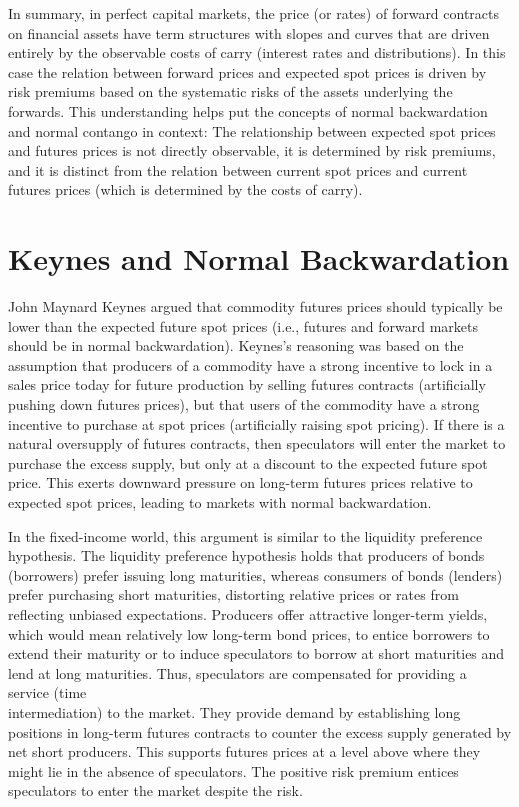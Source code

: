 \documentclass[11pt]{article}
\begin{document}
In summary, in perfect capital markets, the price (or rates) of forward contracts on financial assets have term structures with slopes and curves that are driven entirely by the observable costs of carry (interest rates and distributions). In this case the relation between forward prices and expected spot prices is driven by risk premiums based on the systematic risks of the assets underlying the forwards. This understanding helps put the concepts of normal backwardation and normal contango in context: The relationship between expected spot prices and futures prices is not directly observable, it is determined by risk premiums, and it is distinct from the relation between current spot prices and current futures prices (which is determined by the costs of carry).

\section*{Keynes and Normal Backwardation}
John Maynard Keynes argued that commodity futures prices should typically be lower than the expected future spot prices (i.e., futures and forward markets should be in normal backwardation). Keynes's reasoning was based on the assumption that producers of a commodity have a strong incentive to lock in a sales price today for future production by selling futures contracts (artificially pushing down futures prices), but that users of the commodity have a strong incentive to purchase at spot prices (artificially raising spot pricing). If there is a natural oversupply of futures contracts, then speculators will enter the market to purchase the excess supply, but only at a discount to the expected future spot price. This exerts downward pressure on long-term futures prices relative to expected spot prices, leading to markets with normal backwardation.

In the fixed-income world, this argument is similar to the liquidity preference hypothesis. The liquidity preference hypothesis holds that producers of bonds (borrowers) prefer issuing long maturities, whereas consumers of bonds (lenders) prefer purchasing short maturities, distorting relative prices or rates from reflecting unbiased expectations. Producers offer attractive longer-term yields, which would mean relatively low long-term bond prices, to entice borrowers to extend their maturity or to induce speculators to borrow at short maturities and lend at long maturities. Thus, speculators are compensated for providing a service (time\\
intermediation) to the market. They provide demand by establishing long positions in long-term futures contracts to counter the excess supply generated by net short producers. This supports futures prices at a level above where they might lie in the absence of speculators. The positive risk premium entices speculators to enter the market despite the risk.
\end{document}
